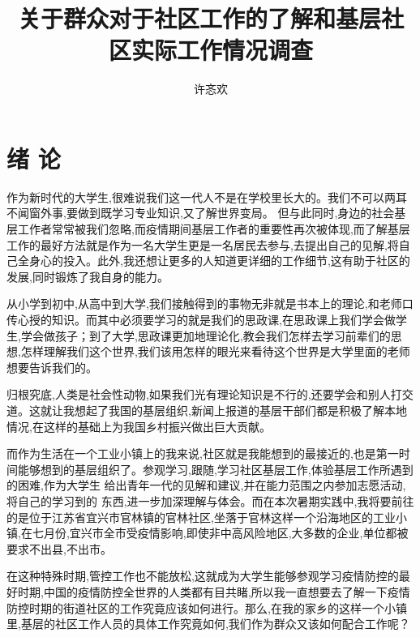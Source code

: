 \documentclass[AutoFakeBold]{LZUThesis}
\begin{document}
\title{{关于群众对于社区工作的了解}{和基层社区实际工作情况调查}}


\entitle{{}{}}

\author{许忞欢}
\advisor{}



\maketitle
\frontmatter


\tableofcontents
\thispagestyle{empty}


\mainmatter
\chapter{绪 \qquad 论}
作为新时代的大学生,很难说我们这一代人不是在学校里长大的。我们不可以两耳不闻窗外事,要做到既学习专业知识,又了解世界变局。 但与此同时,身边的社会基层工作者常常被我们忽略,而疫情期间基层工作者的重要性再次被体现,而了解基层工作的最好方法就是作为一名大学生更是一名居民去参与,去提出自己的见解,将自己全身心的投入。此外,我还想让更多的人知道更详细的工作细节,这有助于社区的发展,同时锻炼了我自身的能力。

从小学到初中,从高中到大学,我们接触得到的事物无非就是书本上的理论,和老师口传心授的知识。而其中必须要学习的就是我们的思政课,在思政课上我们学会做学生,学会做孩子；到了大学,思政课更加地理论化,教会我们怎样去学习前辈们的思想,怎样理解我们这个世界,我们该用怎样的眼光来看待这个世界是大学里面的老师想要告诉我们的。

归根究底,人类是社会性动物,如果我们光有理论知识是不行的,还要学会和别人打交道。这就让我想起了我国的基层组织,新闻上报道的基层干部们都是积极了解本地情况,在这样的基础上为我国乡村振兴做出巨大贡献。

而作为生活在一个工业小镇上的我来说,社区就是我能想到的最接近的,也是第一时间能够想到的基层组织了。参观学习,跟随,学习社区基层工作,体验基层工作所遇到的困难,作为大学生 给出青年一代的见解和建议,并在能力范围之内参加志愿活动,将自己的学习到的 东西,进一步加深理解与体会。而在本次暑期实践中,我将要前往的是位于江苏省宜兴市官林镇的官林社区,坐落于官林这样一个沿海地区的工业小镇,在七月份,宜兴市全市受疫情影响,即使非中高风险地区,大多数的企业,单位都被要求不出县,不出市。

在这种特殊时期,管控工作也不能放松,这就成为大学生能够参观学习疫情防控的最好时期,中国的疫情防控全世界的人类都有目共睹,所以我一直想要去了解一下疫情防控时期的街道社区的工作究竟应该如何进行。那么,在我的家乡的这样一个小镇里,基层的社区工作人员的具体工作究竟如何,我们作为群众又该如何配合工作呢？
\end{document}

